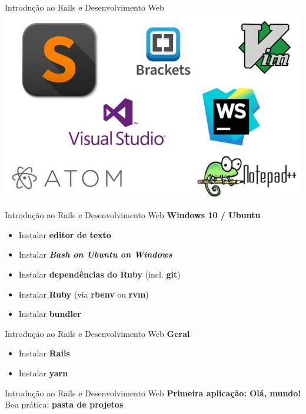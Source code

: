 \documentclass[10pt]{beamer}
\begin{document}
\begin{frame}{Introdução ao Rails e Desenvolvimento Web}
  \huge
  \includegraphics[width=\textwidth]{images/text_editors.png}
\end{frame}

\begin{frame}{Introdução ao Rails e Desenvolvimento Web}
  \huge
  \textbf{Windows 10 / Ubuntu}
  \vfill
  \Large
  \begin{itemize}
    \item Instalar \textbf{editor de texto}
    \item Instalar \textbf{\textit{Bash on Ubuntu on Windows}}
    \item Instalar \textbf{dependências do Ruby} (incl. \textbf{git})
    \item Instalar \textbf{Ruby} (via \textbf{rbenv} ou \textbf{rvm})
    \item Instalar \textbf{bundler}
  \end{itemize}
\end{frame}

\begin{frame}{Introdução ao Rails e Desenvolvimento Web}
  \huge
  \textbf{Geral}
  \vfill
  \begin{itemize}
    \item Instalar \textbf{Rails}
    \item Instalar \textbf{yarn}
  \end{itemize}
\end{frame}

\begin{frame}{Introdução ao Rails e Desenvolvimento Web}
  \huge
  \textbf{Primeira aplicação: \alert{Olá, mundo!}}
  \vfill
  Boa prática: \textbf{pasta de projetos}
\end{frame}
\end{document}
